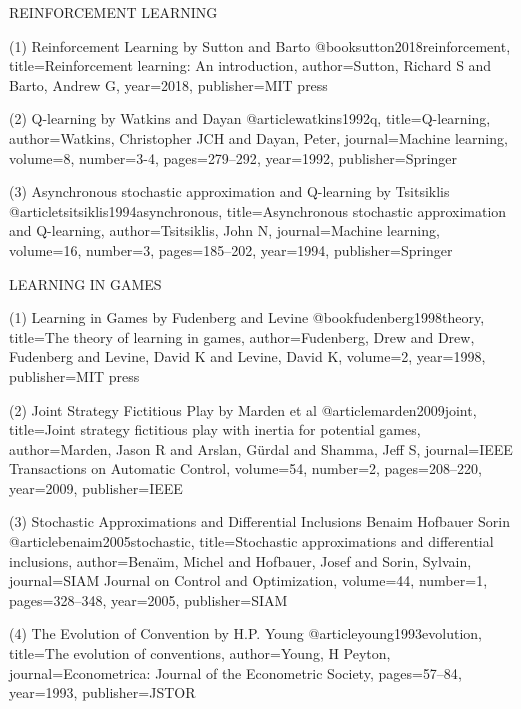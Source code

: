 






REINFORCEMENT LEARNING

(1) Reinforcement Learning by Sutton and Barto
@book{sutton2018reinforcement,
  title={Reinforcement learning: An introduction},
  author={Sutton, Richard S and Barto, Andrew G},
  year={2018},
  publisher={MIT press}
}

(2) Q-learning by Watkins and Dayan
@article{watkins1992q,
  title={Q-learning},
  author={Watkins, Christopher JCH and Dayan, Peter},
  journal={Machine learning},
  volume={8},
  number={3-4},
  pages={279--292},
  year={1992},
  publisher={Springer}
}

(3) Asynchronous stochastic approximation and Q-learning by Tsitsiklis
@article{tsitsiklis1994asynchronous,
  title={Asynchronous stochastic approximation and Q-learning},
  author={Tsitsiklis, John N},
  journal={Machine learning},
  volume={16},
  number={3},
  pages={185--202},
  year={1994},
  publisher={Springer}
}

LEARNING IN GAMES

(1) Learning in Games by Fudenberg and Levine
@book{fudenberg1998theory,
  title={The theory of learning in games},
  author={Fudenberg, Drew and Drew, Fudenberg and Levine, David K and Levine, David K},
  volume={2},
  year={1998},
  publisher={MIT press}
}

(2) Joint Strategy Fictitious Play by Marden et al
@article{marden2009joint,
  title={Joint strategy fictitious play with inertia for potential games},
  author={Marden, Jason R and Arslan, G{\"u}rdal and Shamma, Jeff S},
  journal={IEEE Transactions on Automatic Control},
  volume={54},
  number={2},
  pages={208--220},
  year={2009},
  publisher={IEEE}
}

(3) Stochastic Approximations and Differential Inclusions Benaim Hofbauer Sorin
@article{benaim2005stochastic,
  title={Stochastic approximations and differential inclusions},
  author={Bena{\"\i}m, Michel and Hofbauer, Josef and Sorin, Sylvain},
  journal={SIAM Journal on Control and Optimization},
  volume={44},
  number={1},
  pages={328--348},
  year={2005},
  publisher={SIAM}
}

(4) The Evolution of Convention by H.P. Young
@article{young1993evolution,
  title={The evolution of conventions},
  author={Young, H Peyton},
  journal={Econometrica: Journal of the Econometric Society},
  pages={57--84},
  year={1993},
  publisher={JSTOR}
}

